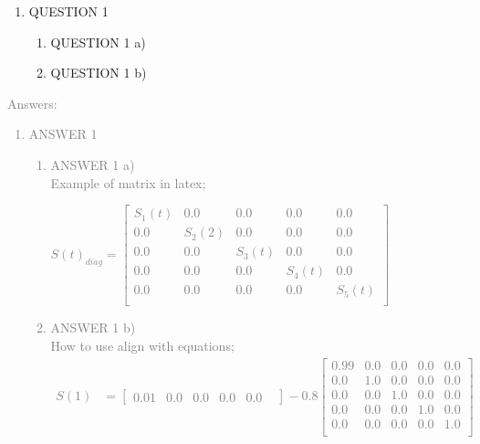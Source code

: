 \documentclass[11pt]{article}
\begin{document}
\begin{enumerate}
	\item QUESTION 1
	\begin{enumerate}
		\item QUESTION 1 a)
		\item QUESTION 1 b)
	\end{enumerate}
\end{enumerate}
\textcolor{gray}{
Answers:
\begin{enumerate}
	\item ANSWER 1 \\
		\begin{enumerate}
			\item ANSWER 1 a)\\
			Example of matrix in latex;\\
			\begin{center}
			 	$S(t)_{diag}=\begin{bmatrix} 
					S_1(t)  & 0.0 & 0.0 & 0.0 & 0.0 \\
					0.0  & S_2(2) & 0.0 & 0.0   & 0.0 \\
					0.0  & 0.0 & S_3(t) & 0.0 & 0.0 \\
					0.0  & 0 .0 & 0.0 & S_4(t) & 0.0 \\
					0.0  & 0 .0 & 0.0 & 0.0 & S_5(t) \\
				\end{bmatrix}$
			\end{center}
			\item ANSWER 1 b)\\
			How to use align with equations;\\
			\begin{align*}
				S(1) &=
					\begin{bmatrix} 
					0.01   &
					0.0 	&
					0.0 	&
					0.0 	&
					0.0 	&
					\end{bmatrix}
					 - 0.8 
					\begin{bmatrix} 
					0.99  & 0.0 & 0.0 & 0.0 & 0.0 \\
					0.0  & 1.0 & 0.0 & 0.0   & 0.0 \\
					0.0  & 0.0 & 1.0 & 0.0 & 0.0 \\
					0.0  & 0 .0 & 0.0 & 1.0 & 0.0 \\
					0.0  & 0 .0 & 0.0 & 0.0 & 1.0 \\
					\end{bmatrix}
			\end{align*}
		\end{enumerate}
\end{enumerate}
}
\end{document}
